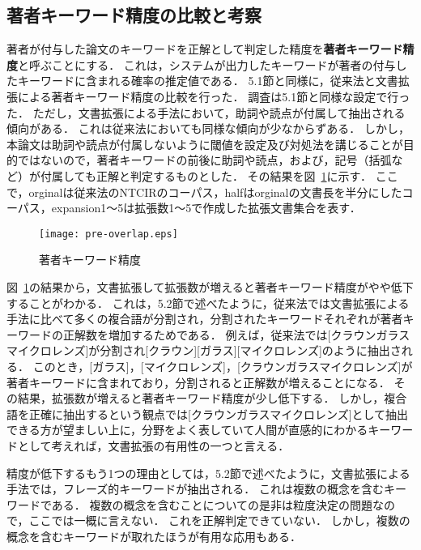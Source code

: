 \documentclass[japanese]{jnlp_1.2c}
\begin{document}
\subsection{著者キーワード精度の比較と考察}
著者が付与した論文のキーワードを正解として判定した精度を{\bf 著者キーワード精度}と呼ぶことにする．
これは，システムが出力したキーワードが著者の付与したキーワードに含まれる確率の推定値である．
5.1節と同様に，従来法と文書拡張による著者キーワード精度の比較を行った．
調査は5.1節と同様な設定で行った．
ただし，文書拡張による手法において，助詞や読点が付属して抽出される傾向がある．
これは従来法においても同様な傾向が少なからずある．
しかし，本論文は助詞や読点が付属しないように閾値を設定及び対処法を講じることが目的ではないので，著者キーワードの前後に助詞や読点，および，記号（括弧など）が付属しても正解と判定するものとした．
その結果を図~\ref{fig:pre-overlap}に示す．
ここで，orginalは従来法のNTCIRのコーパス，halfはorginalの文書長を半分にしたコーパス，expansion1〜5は拡張数1〜5で作成した拡張文書集合を表す．

\begin{figure}[t]
	\begin{center}
		\texttt{[image: pre-overlap.eps]}
	\end{center}
	\caption{著者キーワード精度}
	\label{fig:pre-overlap}
\end{figure}

図~\ref{fig:pre-overlap}の結果から，文書拡張して拡張数が増えると著者キーワード精度がやや低下することがわかる．
これは，5.2節で述べたように，従来法では文書拡張による手法に比べて多くの複合語が分割され，分割されたキーワードそれぞれが著者キーワードの正解数を増加するためである．
例えば，従来法では[クラウンガラスマイクロレンズ]が分割され[クラウン][ガラス][マイクロレンズ]のように抽出される．
このとき，[ガラス]，[マイクロレンズ]，[クラウンガラスマイクロレンズ]が著者キーワードに含まれており，分割されると正解数が増えることになる．
その結果，拡張数が増えると著者キーワード精度が少し低下する．
しかし，複合語を正確に抽出するという観点では[クラウンガラスマイクロレンズ]として抽出できる方が望ましい上に，分野をよく表していて人間が直感的にわかるキーワードとして考えれば，文書拡張の有用性の一つと言える．

精度が低下するもう1つの理由としては，5.2節で述べたように，文書拡張による手法では，フレーズ的キーワードが抽出される．
これは複数の概念を含むキーワードである．
複数の概念を含むことについての是非は粒度決定の問題なので，ここでは一概に言えない．
これを正解判定できていない．
しかし，複数の概念を含むキーワードが取れたほうが有用な応用もある．
\end{document}
